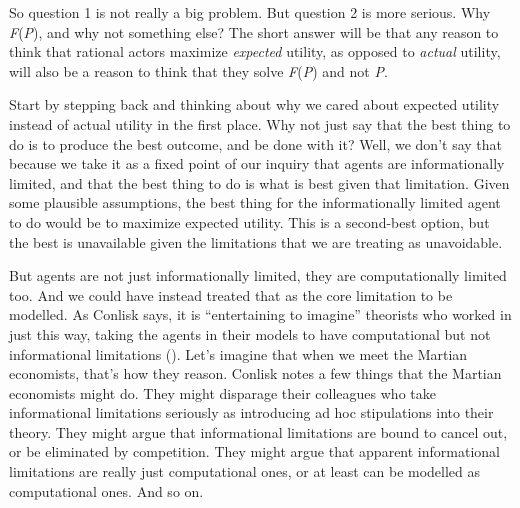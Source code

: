 \documentclass[
  10pt,
  letterpaper,
  DIV=11,
  numbers=noendperiod,
  twoside]{scrartcl}
\begin{document}
So question 1 is not really a big problem. But question 2 is more
serious. Why \emph{F}(\emph{P}), and why not something else? The short
answer will be that any reason to think that rational actors maximize
\emph{expected} utility, as opposed to \emph{actual} utility, will also
be a reason to think that they solve \emph{F}(\emph{P}) and not
\emph{P}.

Start by stepping back and thinking about why we cared about expected
utility instead of actual utility in the first place. Why not just say
that the best thing to do is to produce the best outcome, and be done
with it? Well, we don't say that because we take it as a fixed point of
our inquiry that agents are informationally limited, and that the best
thing to do is what is best given that limitation. Given some plausible
assumptions, the best thing for the informationally limited agent to do
would be to maximize expected utility. This is a second-best option, but
the best is unavailable given the limitations that we are treating as
unavoidable.

But agents are not just informationally limited, they are
computationally limited too. And we could have instead treated that as
the core limitation to be modelled. As Conlisk says, it is
``entertaining to imagine'' theorists who worked in just this way,
taking the agents in their models to have computational but not
informational limitations (). Let's imagine that when we meet the Martian economists, that's
how they reason. Conlisk notes a few things that the Martian economists
might do. They might disparage their colleagues who take informational
limitations seriously as introducing ad hoc stipulations into their
theory. They might argue that informational limitations are bound to
cancel out, or be eliminated by competition. They might argue that
apparent informational limitations are really just computational ones,
or at least can be modelled as computational ones. And so on.
\end{document}
